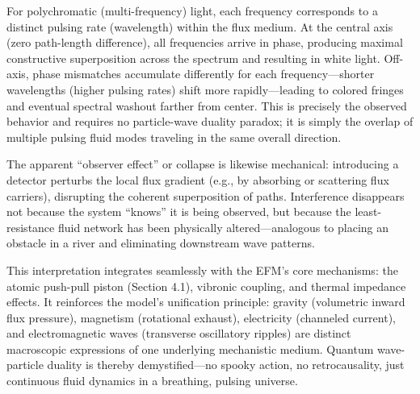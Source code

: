 \documentclass[11pt, a4paper]{article}
\begin{document}
For polychromatic (multi-frequency) light, each frequency corresponds to a distinct pulsing rate (wavelength) within the flux medium. At the central axis (zero path-length difference), all frequencies arrive in phase, producing maximal constructive superposition across the spectrum and resulting in white light. Off-axis, phase mismatches accumulate differently for each frequency—shorter wavelengths (higher pulsing rates) shift more rapidly—leading to colored fringes and eventual spectral washout farther from center. This is precisely the observed behavior and requires no particle-wave duality paradox; it is simply the overlap of multiple pulsing fluid modes traveling in the same overall direction.

The apparent ``observer effect'' or collapse is likewise mechanical: introducing a detector perturbs the local flux gradient (e.g., by absorbing or scattering flux carriers), disrupting the coherent superposition of paths. Interference disappears not because the system ``knows'' it is being observed, but because the least-resistance fluid network has been physically altered—analogous to placing an obstacle in a river and eliminating downstream wave patterns.

This interpretation integrates seamlessly with the EFM's core mechanisms: the atomic push-pull piston (Section 4.1), vibronic coupling, and thermal impedance effects. It reinforces the model's unification principle: gravity (volumetric inward flux pressure), magnetism (rotational exhaust), electricity (channeled current), and electromagnetic waves (transverse oscillatory ripples) are distinct macroscopic expressions of one underlying mechanistic medium. Quantum wave-particle duality is thereby demystified—no spooky action, no retrocausality, just continuous fluid dynamics in a breathing, pulsing universe.
\end{document}
